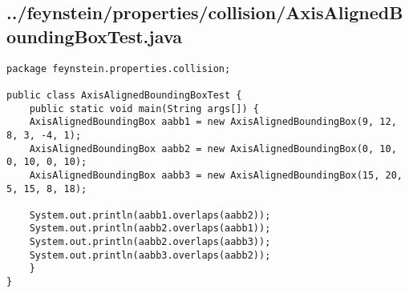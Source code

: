 \subsection*{../feynstein/properties/collision/AxisAlignedBoundingBoxTest.java}
\begin{lstlisting}
package feynstein.properties.collision;

public class AxisAlignedBoundingBoxTest {
    public static void main(String args[]) {
	AxisAlignedBoundingBox aabb1 = new AxisAlignedBoundingBox(9, 12, 8, 3, -4, 1);
	AxisAlignedBoundingBox aabb2 = new AxisAlignedBoundingBox(0, 10, 0, 10, 0, 10);
	AxisAlignedBoundingBox aabb3 = new AxisAlignedBoundingBox(15, 20, 5, 15, 8, 18);

	System.out.println(aabb1.overlaps(aabb2));
	System.out.println(aabb2.overlaps(aabb1));
	System.out.println(aabb2.overlaps(aabb3));
	System.out.println(aabb3.overlaps(aabb2));
    }
}\end{lstlisting}

